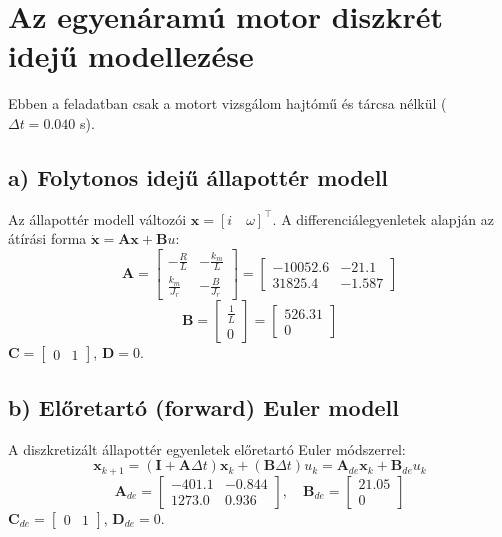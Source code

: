\newpage
\section{Az egyenáramú motor diszkrét idejű modellezése}
Ebben a feladatban csak a motort vizsgálom hajtómű és tárcsa nélkül ($\Delta t = 0.040$ s).
\subsection{a) Folytonos idejű állapottér modell}
Az állapottér modell változói $\mathbf{x} = [i \quad \omega]^\top$. A differenciálegyenletek alapján az átírási forma $\mathbf{\dot{x}} = \mathbf{A} \mathbf{x} + \mathbf{B} u$:
\begin{equation}
    \mathbf{A} =
    \begin{bmatrix}
        -\frac{R}{L}    & -\frac{k_m}{L} \\
        \frac{k_m}{J_r} & -\frac{B}{J_r}
    \end{bmatrix}
    =
    \begin{bmatrix}
        -10052.6 & -21.1  \\
        31825.4  & -1.587
    \end{bmatrix}
\end{equation}
\begin{equation}
    \mathbf{B} =
    \begin{bmatrix}
        \frac{1}{L} \\
        0
    \end{bmatrix}
    =
    \begin{bmatrix}
        526.31 \\
        0
    \end{bmatrix}
\end{equation}
$\mathbf{C} = \begin{bmatrix} 0 & 1 \end{bmatrix}$, $\mathbf{D} = 0$.

\subsection{b) Előretartó (forward) Euler modell}
A diszkretizált állapottér egyenletek előretartó Euler módszerrel:
\begin{equation}
    \mathbf{x}_{k+1} = (\mathbf{I} + \mathbf{A}\Delta t) \mathbf{x}_k + (\mathbf{B}\Delta t) u_k = \mathbf{A}_{de} \mathbf{x}_k + \mathbf{B}_{de} u_k
\end{equation}
\begin{equation}
    \mathbf{A}_{de} =
    \begin{bmatrix}
        -401.1 & -0.844 \\
        1273.0 & 0.936
    \end{bmatrix}, \quad
    \mathbf{B}_{de} =
    \begin{bmatrix}
        21.05 \\
        0
    \end{bmatrix}
\end{equation}
$\mathbf{C}_{de} = \begin{bmatrix} 0 & 1 \end{bmatrix}$, $\mathbf{D}_{de} = 0$.

